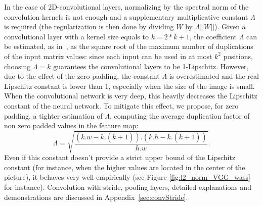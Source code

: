 \documentclass{article}
\begin{document}
In the case of 2D-convolutional layers, normalizing by the spectral norm of the convolution kernels is not enough and a supplementary multiplicative constant $\Lambda$ is required (the regularization is then done by dividing $W$ by $\Lambda||W||$). Given a convolutional layer with a kernel size equals to $k=2*\bar{k}+1$, the coefficient $\Lambda$ can be estimated, as in~\cite{cisse_parseval_2017}, as the square root of the maximum number of duplications of the input matrix values: since each input can be used in at most $k^2$ positions, choosing $\Lambda=k$ guarantees the convolutional layers to be 1-Lipschitz. However, due to the effect of the zero-padding, the constant $\Lambda$ is overestimated and the real Lipschitz constant is lower than 1, especially when the size of the image is small. When the convolutional network is very deep, this heavily decreases  the Lipschitz constant of the neural network. To mitigate this effect, we propose, for zero padding, a tighter estimation of $\Lambda$, computing the average duplication factor of non zero padded values in the feature map:
\begin{equation}
\Lambda=\sqrt{\frac{(k.w-\bar{k}.(\bar{k}+1)).(k.h-\bar{k}.(\bar{k}+1))}{h.w}}.
\label{eq:ConvApproxLip}
\end{equation}
Even if this constant doesn't provide a strict upper bound of the Lipschitz constant (for instance, when the higher values are located in the center of the picture), it behaves very well empirically (see Figure \ref{fig:l2_norm_VGG_wass} for instance).
Convolution with stride, pooling layers, detailed explanations and demonstrations are discussed in Appendix~\ref{sec:convStride}.\\
\end{document}
